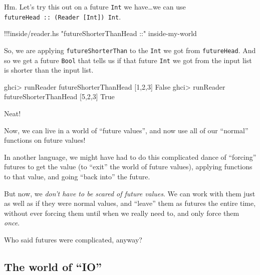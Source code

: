 \documentclass[]{article}
\newenvironment{Shaded}{}{}
\newcommand{\DataTypeTok}[1]{\textcolor[rgb]{0.56,0.13,0.00}{{#1}}}
\newcommand{\DecValTok}[1]{\textcolor[rgb]{0.25,0.63,0.44}{{#1}}}
\newcommand{\StringTok}[1]{\textcolor[rgb]{0.25,0.44,0.63}{{#1}}}
\newcommand{\FunctionTok}[1]{\textcolor[rgb]{0.02,0.16,0.49}{{#1}}}
\newcommand{\NormalTok}[1]{{#1}}
\begin{document}
Hm. Let's try this out on a future \texttt{Int} we have\ldots{}we can
use \texttt{futureHead\ ::\ (Reader\ {[}Int{]})\ Int}.

\begin{Shaded}
\begin{Highlighting}[]
\FunctionTok{!!!}\NormalTok{inside}\FunctionTok{/}\NormalTok{reader}\FunctionTok{.}\NormalTok{hs }\StringTok{"futureShorterThanHead ::"} \NormalTok{inside}\FunctionTok{-}\NormalTok{my}\FunctionTok{-}\NormalTok{world}
\end{Highlighting}
\end{Shaded}

So, we are applying \texttt{futureShorterThan} to the \texttt{Int} we
got from \texttt{futureHead}. And so we get a future \texttt{Bool} that
tells us if that future \texttt{Int} we got from the input list is
shorter than the input list.

\begin{Shaded}
\begin{Highlighting}[]
\NormalTok{ghci}\FunctionTok{>} \NormalTok{runReader futureShorterThanHead [}\DecValTok{1}\NormalTok{,}\DecValTok{2}\NormalTok{,}\DecValTok{3}\NormalTok{]}
\DataTypeTok{False}
\NormalTok{ghci}\FunctionTok{>} \NormalTok{runReader futureShorterThanHead [}\DecValTok{5}\NormalTok{,}\DecValTok{2}\NormalTok{,}\DecValTok{3}\NormalTok{]}
\DataTypeTok{True}
\end{Highlighting}
\end{Shaded}

Neat!

Now, we can live in a world of ``future values'', and now use all of our
``normal'' functions on future values!

In another language, we might have had to do this complicated dance of
``forcing'' futures to get the value (to ``exit'' the world of future
values), applying functions to that value, and going ``back into'' the
future.

But now, we \emph{don't have to be scared of future values}. We can work
with them just as well as if they were normal values, and ``leave'' them
as futures the entire time, without ever forcing them until when we
really need to, and only force them \emph{once}.

Who said futures were complicated, anyway?

\subsection{\texorpdfstring{The world of
``IO''}{The world of IO}}\label{the-world-of-io}
\end{document}
